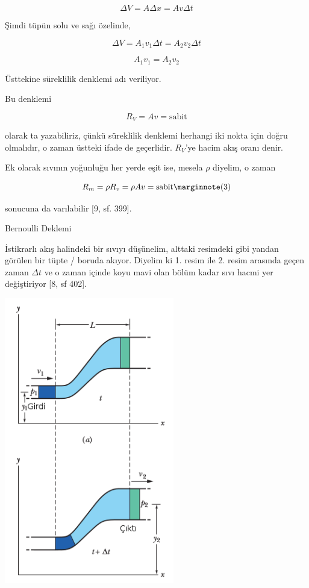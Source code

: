 \documentclass[12pt,fleqn]{article}\usepackage{../../common}
\begin{document}
$$
\Delta V = A \Delta x = A v \Delta t
$$

Şimdi tüpün solu ve sağı özelinde,

$$
\Delta V = A_1 v_1 \Delta t = A_2 v_2 \Delta t
$$

$$
A_1 v_1 = A_2 v_2
$$

Üsttekine süreklilik denklemi adı veriliyor.

Bu denklemi 

$$
R_V = A v = \textrm{sabit}
$$

olarak ta yazabiliriz, çünkü süreklilik denklemi herhangi iki nokta için
doğru olmalıdır, o zaman üstteki ifade de geçerlidir. $R_V$'ye hacim akış
oranı denir. 

Ek olarak sıvının yoğunluğu her yerde eşit ise, mesela $\rho$ diyelim, o
zaman 

$$
R_m = \rho R_v = \rho A v = \textrm{sabit}
\mlabel{3}
$$

sonucuna da varılabilir [9, sf. 399].

Bernoulli Deklemi

İstikrarlı akış halindeki bir sıvıyı düşünelim, alttaki resimdeki gibi
yandan görülen bir tüpte / boruda akıyor. Diyelim ki 1. resim ile 2. resim
arasında geçen zaman $\Delta t$ ve o zaman içinde koyu mavi olan bölüm
kadar sıvı hacmi yer değiştiriyor [8, sf 402].

\includegraphics[width=20em]{phy_045_flight_02.png}
\end{document}
